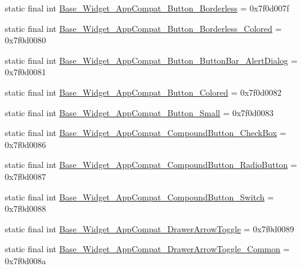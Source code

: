 \begin{DoxyCompactItemize}
\item 
static final int \mbox{\hyperlink{classcom_1_1google_1_1android_1_1gms_1_1R_1_1style_a4da09873c4df9c25e064cb89d3d2b37e}{Base\+\_\+\+Widget\+\_\+\+App\+Compat\+\_\+\+Button\+\_\+\+Borderless}} = 0x7f0d007f
\item 
static final int \mbox{\hyperlink{classcom_1_1google_1_1android_1_1gms_1_1R_1_1style_a8109c768ce34d95db954d2d07e6c851e}{Base\+\_\+\+Widget\+\_\+\+App\+Compat\+\_\+\+Button\+\_\+\+Borderless\+\_\+\+Colored}} = 0x7f0d0080
\item 
static final int \mbox{\hyperlink{classcom_1_1google_1_1android_1_1gms_1_1R_1_1style_add6fb11e0a668a8e151f0b0c57585080}{Base\+\_\+\+Widget\+\_\+\+App\+Compat\+\_\+\+Button\+\_\+\+Button\+Bar\+\_\+\+Alert\+Dialog}} = 0x7f0d0081
\item 
static final int \mbox{\hyperlink{classcom_1_1google_1_1android_1_1gms_1_1R_1_1style_a84e4ae19aa158d1399816cbdaaf9cec6}{Base\+\_\+\+Widget\+\_\+\+App\+Compat\+\_\+\+Button\+\_\+\+Colored}} = 0x7f0d0082
\item 
static final int \mbox{\hyperlink{classcom_1_1google_1_1android_1_1gms_1_1R_1_1style_ace9d788fa24343ec1975e66f7e157e63}{Base\+\_\+\+Widget\+\_\+\+App\+Compat\+\_\+\+Button\+\_\+\+Small}} = 0x7f0d0083
\item 
static final int \mbox{\hyperlink{classcom_1_1google_1_1android_1_1gms_1_1R_1_1style_a96e4b7dba22a47e433c779eef0c6300c}{Base\+\_\+\+Widget\+\_\+\+App\+Compat\+\_\+\+Compound\+Button\+\_\+\+Check\+Box}} = 0x7f0d0086
\item 
static final int \mbox{\hyperlink{classcom_1_1google_1_1android_1_1gms_1_1R_1_1style_a1840b6ae6f0f128b5d581e306f9f2cbc}{Base\+\_\+\+Widget\+\_\+\+App\+Compat\+\_\+\+Compound\+Button\+\_\+\+Radio\+Button}} = 0x7f0d0087
\item 
static final int \mbox{\hyperlink{classcom_1_1google_1_1android_1_1gms_1_1R_1_1style_a5e49803a9a90488048317abc11e264f0}{Base\+\_\+\+Widget\+\_\+\+App\+Compat\+\_\+\+Compound\+Button\+\_\+\+Switch}} = 0x7f0d0088
\item 
static final int \mbox{\hyperlink{classcom_1_1google_1_1android_1_1gms_1_1R_1_1style_ae9bbd9488d0448de757e7d3385f796d3}{Base\+\_\+\+Widget\+\_\+\+App\+Compat\+\_\+\+Drawer\+Arrow\+Toggle}} = 0x7f0d0089
\item 
static final int \mbox{\hyperlink{classcom_1_1google_1_1android_1_1gms_1_1R_1_1style_ab533ff2d7201f769c260daf63683748d}{Base\+\_\+\+Widget\+\_\+\+App\+Compat\+\_\+\+Drawer\+Arrow\+Toggle\+\_\+\+Common}} = 0x7f0d008a
\item 

\end{DoxyCompactItemize}
